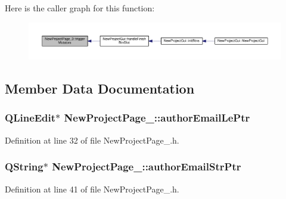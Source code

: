 Here is the caller graph for this function\-:
\nopagebreak
\begin{figure}[H]
\begin{center}
\leavevmode
\includegraphics[width=350pt]{class_new_project_page__3_a0895bbb7ddabccb9866e903c99a6607c_icgraph}
\end{center}
\end{figure}




\subsection{Member Data Documentation}
\hypertarget{class_new_project_page__3_a34b1101f7b0179d76b0cf77e5584233c}{
\subsubsection[{author\-Email\-Le\-Ptr}]{\setlength{\rightskip}{0pt plus 5cm}Q\-Line\-Edit$\ast$ New\-Project\-Page\-\_\-::author\-Email\-Le\-Ptr\hspace{0.3cm}{\ttfamily [private]}}}\label{class_new_project_page__3_a34b1101f7b0179d76b0cf77e5584233c}


Definition at line 32 of file New\-Project\-Page\-\_.\-h.

\hypertarget{class_new_project_page__3_a5c83d9f13f428782e082537dd4c65187}{
\subsubsection[{author\-Email\-Str\-Ptr}]{\setlength{\rightskip}{0pt plus 5cm}Q\-String$\ast$ New\-Project\-Page\-\_\-::author\-Email\-Str\-Ptr\hspace{0.3cm}{\ttfamily [private]}}}\label{class_new_project_page__3_a5c83d9f13f428782e082537dd4c65187}


Definition at line 41 of file New\-Project\-Page\-\_.\-h.

